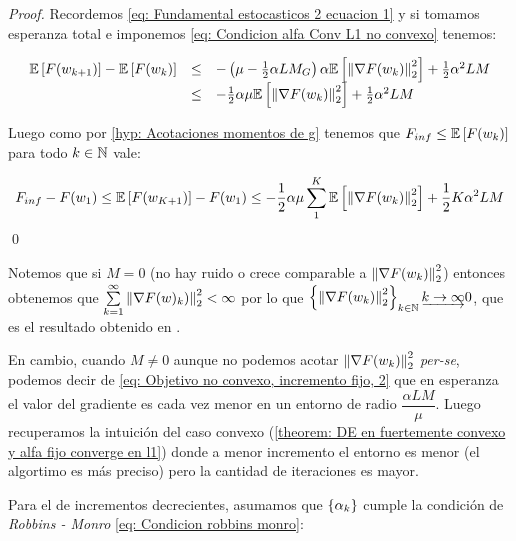 \begin{proof}
	Recordemos \ref{eq: Fundamental estocasticos 2 ecuacion 1} y si tomamos esperanza total e imponemos \ref{eq: Condicion alfa Conv L1 no convexo} tenemos:
	
	\begin{equation*}
	\begin{array}{rcl}
	\mathbb{E} \left[F(w_{k+1})\right] - \mathbb{E} \left[F(w_k)\right] & \leq & - \left(\mu - \frac{1}{2}\alpha L M_G \right) \alpha \mathbb{E} \left[\left\lVert\nabla F(w_k)\right\rVert_2^2\right] + \frac{1}{2} \alpha^2 LM \\
	& \leq & - \frac{1}{2}\alpha \mu \mathbb{E} \left[\left\lVert\nabla F(w_k)\right\rVert_2^2\right] + \frac{1}{2} \alpha^2 LM
	\end{array}
	\end{equation*}
	
	Luego como por \ref{hyp: Acotaciones momentos de g} tenemos que $F_{inf} \leq \mathbb{E} \left[F(w_k)\right]$ para todo $k \in {\mathbb{N}}$ vale:
	
	\begin{equation*}
		F_{inf} - F(w_1) \leq \mathbb{E} \left[F(w_{K+1})\right] - F(w_1) \leq  - \frac{1}{2}\alpha \mu \sum\limits_{1}^{K}{\mathbb{E} \left[\left\lVert\nabla F(w_k)\right\rVert_2^2\right]} + \frac{1}{2} K \alpha^2 LM
	\end{equation*}
	\qed
\end{proof}

\begin{remark}
	Notemos que si $M=0$ (no hay ruido o crece comparable a $\left\lVert\nabla F(w_k)\right\rVert^2_2$) entonces obtenemos que $\sum\limits_{k=1}^{\infty} {\left\lVert\nabla F (w)_k)\right\rVert_2^2} < \infty$ por lo que $\left\lbrace\left\lVert\nabla F (w_k)\right\rVert_2^2\right\rbrace_{k \in {\mathbb{N}}} \underrightarrow{k \rightarrow \infty} 0 $, que es el resultado obtenido en \cite{nesterov:2004}.
	
	En cambio, cuando $M \neq 0$ aunque no podemos acotar $\left\lVert\nabla F (w_k)\right\rVert_2^2$ \textit{per-se}, podemos decir de \ref{eq: Objetivo no convexo, incremento fijo, 2} que en esperanza el valor del gradiente es cada vez menor en un entorno de radio $\dfrac{\alpha LM}{\mu}$. Luego recuperamos la intuici\'on del caso convexo (\ref{theorem: DE en fuertemente convexo y alfa fijo converge en l1}) donde a menor incremento el entorno es menor (el algortimo es m\'as preciso) pero la cantidad de iteraciones es mayor.
\end{remark}

Para el de incrementos decrecientes, asumamos que $\left\lbrace\alpha_k\right\rbrace$ cumple la condici\'on de \textit{Robbins - Monro} \ref{eq: Condicion robbins monro}:

